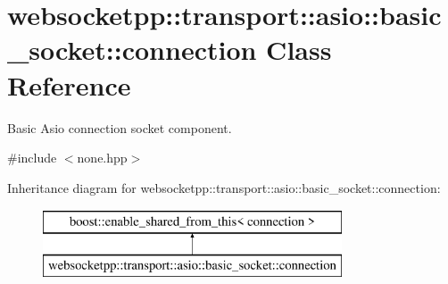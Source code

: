 \hypertarget{classwebsocketpp_1_1transport_1_1asio_1_1basic__socket_1_1connection}{}\section{websocketpp\+:\+:transport\+:\+:asio\+:\+:basic\+\_\+socket\+:\+:connection Class Reference}
\label{classwebsocketpp_1_1transport_1_1asio_1_1basic__socket_1_1connection}


Basic Asio connection socket component.  




{\ttfamily \#include $<$none.\+hpp$>$}

Inheritance diagram for websocketpp\+:\+:transport\+:\+:asio\+:\+:basic\+\_\+socket\+:\+:connection\+:\begin{figure}[H]
\begin{center}
\leavevmode
\includegraphics[height=2.000000cm]{classwebsocketpp_1_1transport_1_1asio_1_1basic__socket_1_1connection}
\end{center}
\end{figure}
